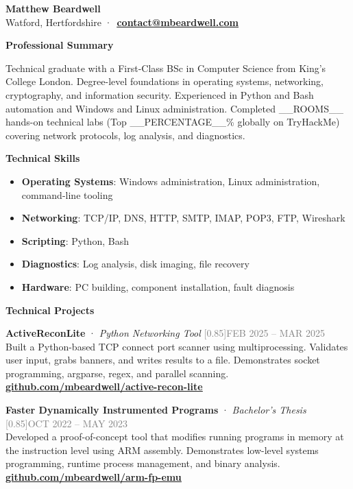 \documentclass[10pt,a4paper]{article}
\newcommand{\paragap}{0.30em}
\newcommand{\headermargin}{0.00em}
\newcommand{\setfontsize}[2]{\fontsize{#1}{#1}\selectfont{}#2}
\newcommand{\textcolorbf}[1]{\textbf{\textcolor{surface}{#1}}}
\newcommand{\cvlink}[2]{\uline{\href{#1}{\textcolor{surface}{\textbf{#2}}}}}
\newcommand{\cvlinksmall}[2]{{\small\cvlink{#1}{#2}\hspace{-0.3em}}}
\newcommand{\fakecaps}[1]{{\addfontfeatures{LetterSpace=1.5}\scalebox{0.85}[0.85]{\MakeUppercase{#1}}}} %
\newcommand{\metadatafmt}[1]{{\textcolor{gray}{\fakecaps{#1}}}}
\newenvironment{cvsection}[1]{
  \begin{tcolorbox}[
    colback=accent!25,
    boxrule=0pt,
    colframe=white,
    left=4pt,
    right=4pt,
    top=2pt,
    bottom=2pt,
    sharp corners=all,
    coltext=surface
  ]
    \textcolorbf{#1}
  \end{tcolorbox}
  \vspace{\headermargin}
}
{\vspace{\headermargin}}
\newcommand{\entry}[3]{
  \par\vspace{\paragap}
  #1 \hfill \metadatafmt{#2} \\
  #3
}
\begin{document}
\begin{flushleft}
  {{\setfontsize{26pt}{\textcolorbf{Matthew Beardwell}}}} \\[1.1em]
  Watford, Hertfordshire ·\
  \cvlink{mailto:contact@mbeardwell.com}{contact@mbeardwell.com} \\
\end{flushleft}

\begin{cvsection}{Professional Summary}
  Technical graduate with a First-Class BSc in Computer Science from King's College London.
  Degree-level foundations in operating systems, networking, cryptography, and information security.
  Experienced in Python and Bash automation and Windows and Linux administration.
  Completed __ROOMS__ hands-on technical labs (Top __PERCENTAGE__\% globally on TryHackMe) covering network protocols, log analysis, and diagnostics.
\end{cvsection}

\begin{cvsection}{Technical Skills}
  \begin{itemize}[leftmargin=*]
    \item \textcolorbf{Operating Systems}: Windows administration, Linux administration, command-line tooling
    \item \textcolorbf{Networking}: TCP/IP, DNS, HTTP, SMTP, IMAP, POP3, FTP, Wireshark
    \item \textcolorbf{Scripting}: Python, Bash
    \item \textcolorbf{Diagnostics}: Log analysis, disk imaging, file recovery
    \item \textcolorbf{Hardware}: PC building, component installation, fault diagnosis
  \end{itemize}
\end{cvsection}

\begin{cvsection}{Technical Projects}
  \entry{\textcolorbf{ActiveReconLite} · \textit{Python Networking Tool}}{Feb 2025 – Mar 2025}{
    Built a Python-based TCP connect port scanner using multiprocessing. Validates user input, grabs banners, and writes results to a file.
    Demonstrates socket programming, argparse, regex, and parallel scanning.\\
    \phantom{.}\hfill\cvlinksmall{https://github.com/mbeardwell/active-recon-lite}{github.com/mbeardwell/active-recon-lite}
  }

  \entry{\textcolorbf{Faster Dynamically Instrumented Programs} · \textit{Bachelor's Thesis}}{Oct 2022 – May 2023}{
    Developed a proof-of-concept tool that modifies running programs in memory at the instruction level using ARM assembly.
    Demonstrates low-level systems programming, runtime process management, and binary analysis. \\
    \phantom{.}\hfill\cvlinksmall{https://github.com/mbeardwell/arm-fp-emu}{github.com/mbeardwell/arm-fp-emu}
  }
\end{cvsection}
\end{document}
